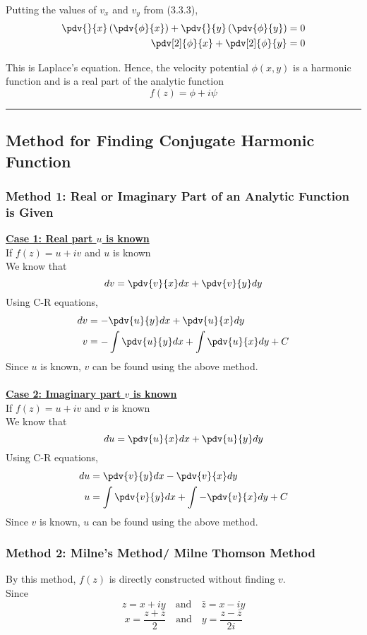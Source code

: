Putting the values of $v_x$ and $v_y$ from (3.3.3),
\begin{align*}
    \pdv{}{x} \left( \pdv{\phi}{x} \right) + \pdv{}{y} \left( \pdv{\phi}{y} \right) &= 0 \\
    \pdv[2]{\phi}{x} + \pdv[2]{\phi}{y} &= 0
\end{align*}

This is Laplace's equation. Hence, the velocity potential $\phi(x,y)$ is a harmonic function and is a real part of the analytic function
\[
    f(z) = \phi + i\psi
\]

\vspace{20pt}\rule{3in}{1pt}


\newpage
\subsection{Method for Finding Conjugate Harmonic Function}
\subsubsection{Method 1: Real or Imaginary Part of an Analytic Function is Given}
\underline{\textbf{Case 1: Real part $u$ is known}} \\
If $f(z) = u + iv$ and $u$ is known \\

We know that \[
    d{v} = \pdv{v}{x} d{x} + \pdv{v}{y} d{y}
\] 
Using C-R equations,
\begin{align*}
    d{v} &= -\pdv{u}{y} d{x} + \pdv{u}{x} d{y} \\
    v &= -\int \pdv{u}{y} d{x} + \int \pdv{u}{x} d{y} + C
\end{align*}
Since $u$ is known, $v$ can be found using the above method. \\~\\

\underline{\textbf{Case 2: Imaginary part $v$ is known}} \\
If $f(z) = u + iv$ and $v$ is known \\

We know that \[
    d{u} = \pdv{u}{x} d{x} + \pdv{u}{y} d{y}
\] 
Using C-R equations,
\begin{align*}
    d{u} &= \pdv{v}{y} d{x} - \pdv{v}{x} d{y} \\
    u &= \int \pdv{v}{y} d{x} + \int -\pdv{v}{x} d{y} + C
\end{align*}
Since $v$ is known, $u$ can be found using the above method.

\subsubsection{Method 2: Milne's Method/ Milne Thomson Method}
By this method, $f(z)$ is directly constructed without finding $v$. \\
Since \[
    z = x + iy \quad \text{and} \quad \bar{z} = x - iy
\] \[
    x = \frac{z + \bar{z}}{2} \quad \text{and} \quad y = \frac{z - \bar{z}}{2i}
\] 

